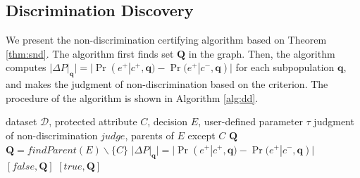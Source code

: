 \documentclass[twoside,leqno,twocolumn]{article}
\begin{document}
\subsection{Discrimination Discovery}\label{sec:dda}
We present the non-discrimination certifying algorithm based on Theorem \ref{thm:snd}. The algorithm first finds set $\mathbf{Q}$ in the graph. Then, the algorithm computes $|\Delta P|_{\mathbf{q}}|=|\Pr(e^{+}|c^{+}, \mathbf{q})-\Pr(e^{+}|c^{-}, \mathbf{q})|$ for each subpopulation $\mathbf{q}$, and makes the judgment of non-discrimination based on the criterion. The procedure of the algorithm is shown in Algorithm \ref{alg:dd}.

\begin{algorithm}\small
\caption{Certifying of Non-Discrimination (Certify)}
\label{alg:dd}
\begin{algorithmic}[1]
\REQUIRE dataset $\mathcal{D}$, protected attribute $C$, decision $E$, user-defined parameter $\tau$
\ENSURE judgment of non-discrimination $judge$, parents of $E$ except $C$ $\mathbf{Q}$
		\STATE $\mathbf{Q}= findParent(E)\backslash \{C\}$
			\STATE $|\Delta P|_{\mathbf{q}}|=|\Pr(e^{+}|c^{+}, \mathbf{q})-\Pr(e^{+}|c^{-}, \mathbf{q})|$
				\RETURN $[false,\mathbf{Q}]$
			\ENDIF
		\ENDFOR
		\RETURN $[true,\mathbf{Q}]$
\end{algorithmic}
\end{algorithm}
\end{document}
